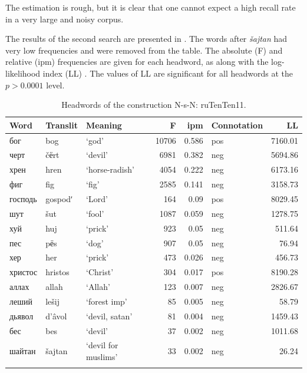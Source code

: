 \documentclass[output=paper]{langscibook}
\begin{document}
The estimation is rough, but it is clear that one cannot expect a high recall rate in a very large and noisy corpus. 

The results of the second search are presented in . The words after \textit{šajtan} had very low frequencies and were removed from the table. The absolute (F) and relative (ipm) frequencies are given for each headword, as along with the log-likelihood index (LL) \parencites{Dunning1993}[111]{Xiao2015}[223--239]{Levshina2015}. The values of LL are significant for all headwords at the $p>0.0001$ level.


\begin{table}
\begin{tabularx}{\textwidth}{XXl rrXr}
\lsptoprule
{Word} & {Translit} & {Meaning} & {F} & {ipm} & {Connotation} & {LL}\\
\midrule
{{бог}} & {bog} & {‘god’} & {10706} & {0.586} & {pos} & {7160.01}\\
{{черт}} & {č{ёrt}} & {‘devil’} & {6981} & {0.382} & {neg} & {5694.86}\\
{{хрен}} & {hren} & {‘horse-radish’} & {4054} & {0.222} & {neg} & {6173.16}\\
{{фиг}} & {fig} & {‘fig’} & {2585} & {0.141} & {neg} & {3158.73}\\
{{господь}} & {gospodʹ} & {‘Lord’} & {164} & {0.09} & {pos} & {8029.45}\\
{{шут}} & {šut} & {‘fool’} & {1087} & {0.059} & {neg} & {1278.75}\\
{{хуй}} & {huj} & {‘prick’} & {923} & {0.05} & {neg} & {511.64}\\
{{пес}} & {p{ёs}} & {‘dog’} & {907} & {0.05} & {neg} & {76.94}\\
{{хер}} & {her} & {‘prick’} & {473} & {0.026} & {neg} & {456.73}\\
{{христос}} & {hristos} & {‘Christ’} & {304} & {0.017} & {pos} & {8190.28}\\
{{аллах}} & {allah} & {‘Allah’} & {123} & {0.007} & {neg} & {2826.67}\\
{{леший}} & {lešij} & {‘forest imp’} & {85} & {0.005} & {neg} & {58.79}\\
{{дьявол}} & {d’âvol} & {‘devil, satan’} & {81} & {0.004} & {neg} & {1459.43}\\
{{бес}} & {bes} & {‘devil’} & {37} & {0.002} & {neg} & {1011.68}\\
{{шайтан}} & {šajtan} & {‘devil for muslims’} & {33} & {0.002} & {neg} & {26.24}\\
\lspbottomrule
\end{tabularx}
\caption{Headwords of the construction N-s-N: ruTenTen11.\label{tab:mikhailov:2}}
\end{table}
\end{document}
